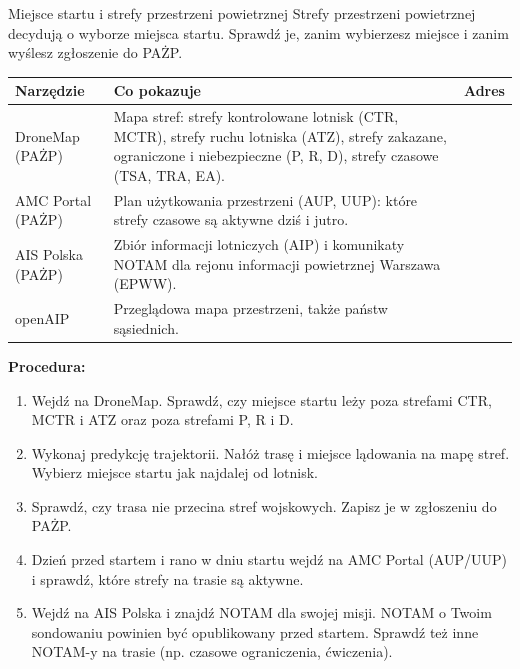 \begin{sekcja}{Miejsce startu i strefy przestrzeni powietrznej}\label{sec:strefy}
Strefy przestrzeni powietrznej decydują o wyborze miejsca startu. Sprawdź je, zanim wybierzesz miejsce i zanim wyślesz zgłoszenie do PAŻP.

\renewcommand{\arraystretch}{1.3}
\small
\begin{tabularx}{\linewidth}{@{}P{30mm}LP{44mm}@{}}
\toprule
\textbf{Narzędzie} & \textbf{Co pokazuje} & \textbf{Adres}\\\midrule
DroneMap (PAŻP) & Mapa stref: strefy kontrolowane lotnisk (CTR, MCTR), strefy ruchu lotniska (ATZ), strefy zakazane, ograniczone i niebezpieczne (P, R, D), strefy czasowe (TSA, TRA, EA). & \\
AMC Portal (PAŻP) & Plan użytkowania przestrzeni (AUP, UUP): które strefy czasowe są aktywne dziś i jutro. & \\
AIS Polska (PAŻP) & Zbiór informacji lotniczych (AIP) i komunikaty NOTAM dla rejonu informacji powietrznej Warszawa (EPWW). & \\
openAIP & Przeglądowa mapa przestrzeni, także państw sąsiednich. & \\
\bottomrule
\end{tabularx}
\normalsize

\textbf{Procedura:}
\begin{enumerate}
  \item Wejdź na DroneMap. Sprawdź, czy miejsce startu leży poza strefami CTR, MCTR i ATZ oraz poza strefami P, R i D.
  \item Wykonaj predykcję trajektorii. Nałóż trasę i miejsce lądowania na mapę stref. Wybierz miejsce startu jak najdalej od lotnisk.
  \item Sprawdź, czy trasa nie przecina stref wojskowych. Zapisz je w zgłoszeniu do PAŻP.
  \item Dzień przed startem i rano w dniu startu wejdź na AMC Portal (AUP/UUP) i sprawdź, które strefy na trasie są aktywne.
  \item Wejdź na AIS Polska i znajdź NOTAM dla swojej misji. NOTAM o Twoim sondowaniu powinien być opublikowany przed startem. Sprawdź też inne NOTAM-y na trasie (np. czasowe ograniczenia, ćwiczenia).
\end{enumerate}
\end{sekcja}

